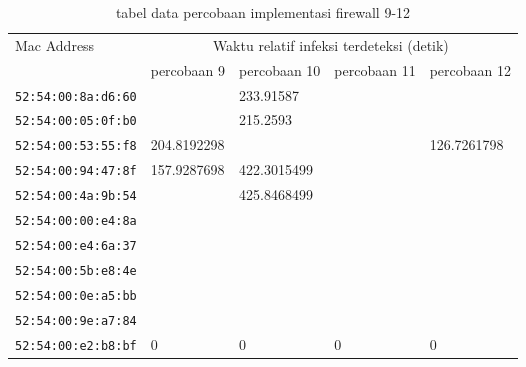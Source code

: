\begin{table}[H]
	\caption{tabel data percobaan implementasi firewall 9-12}
	\label{table:data percobaan implementasi firewall 9_12}
	\centering
	\footnotesize
	\begin{tabular}{|l|l|l|l|l|}
		\hline
		\multirow{2}{*}{Mac Address} & \multicolumn{4}{c|}{Waktu relatif infeksi terdeteksi (detik)} \\ \cline{2-5} 
		& percobaan 9 & percobaan 10 & percobaan 11 & percobaan 12\\ \hline
		\footnotesize{\verb|52:54:00:8a:d6:60|} &  & 233.91587 &  & \\ \hline
		\footnotesize{\verb|52:54:00:05:0f:b0|} &  & 215.2593 &  & \\ \hline
		\footnotesize{\verb|52:54:00:53:55:f8|} & 204.8192298 &  &  & 126.7261798\\ \hline
		\footnotesize{\verb|52:54:00:94:47:8f|} & 157.9287698 & 422.3015499 &  & \\ \hline
		\footnotesize{\verb|52:54:00:4a:9b:54|} &  & 425.8468499 &  & \\ \hline
		\footnotesize{\verb|52:54:00:00:e4:8a|} &  &  &  & \\ \hline
		\footnotesize{\verb|52:54:00:e4:6a:37|} &  &  &  & \\ \hline
		\footnotesize{\verb|52:54:00:5b:e8:4e|} &  &  &  & \\ \hline
		\footnotesize{\verb|52:54:00:0e:a5:bb|} &  &  &  & \\ \hline
		\footnotesize{\verb|52:54:00:9e:a7:84|} &  &  &  & \\ \hline
		\footnotesize{\verb|52:54:00:e2:b8:bf|} & 0 & 0 & 0 & 0\\ \hline
	\end{tabular}
\end{table}

